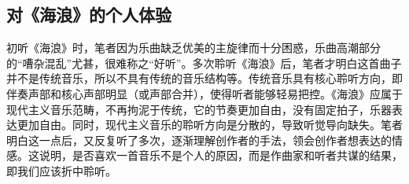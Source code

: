 \documentclass{ctexart}
\begin{document}
	\subsection{对《海浪》的个人体验}
	初听《海浪》时，笔者因为乐曲缺乏优美的主旋律而十分困惑，乐曲高潮部分的“嘈杂混乱”尤甚，很难称之“好听”。多次聆听《海浪》后，笔者才明白这首曲子并不是传统音乐，所以不具有传统的音乐结构等。传统音乐具有核心聆听方向，即伴奏声部和核心声部明显（或声部合并），使得听者能够轻易把控。《海浪》应属于现代主义音乐范畴，不再拘泥于传统，它的节奏更加自由，没有固定拍子，乐器表达更加自由。同时，现代主义音乐的聆听方向是分散的，导致听觉导向缺失。笔者明白这一点后，又反复听了多次，逐渐理解创作者的手法，领会创作者想表达的情感。这说明，是否喜欢一首音乐不是个人的原因，而是作曲家和听者共谋的结果，即我们应该折中聆听。
\end{document}
